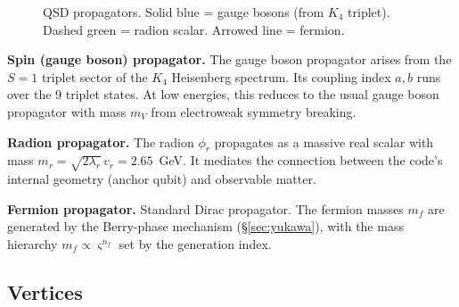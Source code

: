 \documentclass[11pt,a4paper]{article}
\theoremstyle{definition}
\theoremstyle{remark}
\newcommand{\strain}{\varsigma}
\begin{document}
\begin{figure}[H]
\centering
{}
\caption{QSD propagators. Solid blue = gauge bosons (from $K_4$ triplet). Dashed green = radion scalar. Arrowed line = fermion.}
\label{fig:propagators}
\end{figure}

\noindent\textbf{Spin (gauge boson) propagator.}
The gauge boson propagator arises from the $S=1$ triplet sector of the $K_4$ Heisenberg spectrum. Its coupling index $a,b$ runs over the 9 triplet states. At low energies, this reduces to the usual gauge boson propagator with mass $m_V$ from electroweak symmetry breaking.

\noindent\textbf{Radion propagator.}
The radion $\phi_r$ propagates as a massive real scalar with mass $m_r = \sqrt{2\lambda_r}\,v_r = 2.65$~GeV. It mediates the connection between the code's internal geometry (anchor qubit) and observable matter.

\noindent\textbf{Fermion propagator.}
Standard Dirac propagator. The fermion masses $m_f$ are generated by the Berry-phase mechanism (\S\ref{sec:yukawa}), with the mass hierarchy $m_f \propto \strain^{n_f}$ set by the generation index.

\subsection{Vertices}
\end{document}
